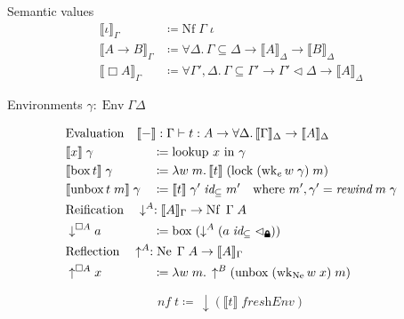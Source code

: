 \documentclass{beamer}
\newcommand{\lock}{\text{\tikz[baseline]{
      \fill[rounded corners=.1ex] (-.75ex,0) rectangle (.75ex,1ex);
      \draw[line width=.3ex] (-.4ex,.5ex) -- ++(0,.75ex) arc (180:0:.4ex) -- ++(0,-.75ex);
}}}
\begin{document}
\begin{frame}{Semantic values}
  \begin{equation*}
    \begin{split}
      \llbracket \iota \rrbracket_\Gamma &\coloneqq \text{Nf} \; \Gamma \; \iota \\
      \llbracket A \to B \rrbracket_\Gamma &\coloneqq \forall \Delta. \, \Gamma \subseteq \Delta \to \llbracket A \rrbracket_\Delta \to \llbracket B \rrbracket_\Delta \\
      \llbracket \Box A \rrbracket_\Gamma &\coloneqq \forall \Gamma', \Delta. \, \Gamma \subseteq \Gamma' \to \Gamma'\lhd\Delta \to \llbracket A \rrbracket_\Delta
    \end{split}
  \end{equation*}

  Environments $\gamma : \operatorname{Env} \Gamma \Delta$
\end{frame}

\begin{frame}
  \begin{align*}
    &\mathrlap{\text{Evaluation} \quad \llbracket-\rrbracket : \Gamma \vdash t : A \to \forall\Delta. \, \llbracket\Gamma\rrbracket_\Delta \to \llbracket A \rrbracket_\Delta} &&\\
    &\llbracket x \rrbracket \; \gamma &&\coloneqq \text{lookup } x \text{ in } \gamma \\
    &\llbracket \operatorname{box} t \rrbracket \; \gamma &&\coloneqq \lambda w \; m.\, \llbracket t \rrbracket \; (\operatorname{lock} \; (\operatorname{wk}_e w \; \gamma) \; m) \\
    &\llbracket \operatorname{unbox} t \; m \rrbracket \; \gamma &&\coloneqq \llbracket t \rrbracket \; \gamma' \; \textit{id}_\subseteq \; m' \quad \text{where } m' , \gamma' = \textit{rewind} \; m \; \gamma \\
    &\mathrlap{\text{Reification} \quad \downarrow^A : \llbracket A \rrbracket_\Gamma \to \operatorname{Nf} \; \Gamma \; A} &&\\
    &\downarrow^{\Box A} a &&\coloneqq \operatorname{box} \; (\downarrow^A (a \; \textit{id}_\subseteq \; \lhd_\lock)) \\
    &\mathrlap{\text{Reflection} \quad \uparrow^A : \operatorname{Ne} \; \Gamma \; A \to \llbracket A \rrbracket_\Gamma} &&\\
    &\uparrow^{\Box A} x &&\coloneqq \lambda w \; m.\, \uparrow^B (\operatorname{unbox} \; (\operatorname{wk}_{\operatorname{Ne}} w \; x) \; m)
  \end{align*}

  $$ nf \; t \coloneqq\, \downarrow (\llbracket t \rrbracket \; \textit{freshEnv}) $$
\end{frame}
\end{document}
